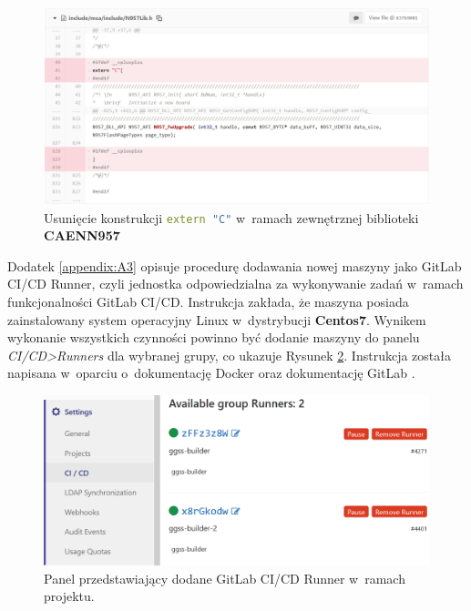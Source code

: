 \begin{figure}
\includegraphics[width=\textwidth]{res/png/removeExternC}
\caption{Usunięcie konstrukcji \lstinline[language=c++]{extern "C"} w~ramach zewnętrznej biblioteki \textbf{CAENN957}}
\label{fig:removeExternC}
\end{figure}

\onecolumn




\newpage





Dodatek \ref{appendix:A3} opisuje procedurę dodawania nowej maszyny jako GitLab CI/CD Runner, czyli jednostka odpowiedzialna za wykonywanie zadań w~ramach funkcjonalności GitLab CI/CD. Instrukcja zakłada, że maszyna posiada zainstalowany system operacyjny Linux w~dystrybucji \textbf{Centos7}. Wynikem wykonanie wszystkich czynności powinno być dodanie maszyny do panelu \textit{CI/CD>Runners} dla wybranej grupy, co ukazuje Rysunek \ref{fig:runner}. Instrukcja została napisana w~oparciu o~dokumentację Docker \cite{DockerInstall} oraz dokumentację GitLab \cite{RunnerRegister}.

\begin{figure}
\includegraphics[width=\textwidth]{res/png/runnerAdded}
\caption{Panel przedstawiający dodane GitLab CI/CD Runner w~ramach projektu.}
\label{fig:runner}
\end{figure}
